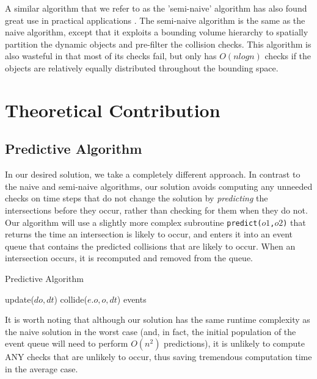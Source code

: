 \documentclass[CEJCS,PDF]{cej} %
\begin{document}
A similar algorithm that we refer to as the 'semi-naive' algorithm has also found great use in practical applications \cite{Bittner02hierarchicaltechniques}.  The semi-naive algorithm is the same as the naive algorithm, except that it exploits a bounding volume hierarchy to spatially partition the dynamic objects and pre-filter the collision checks.  This algorithm is also wasteful in that most of its checks fail, but only has $O(n log n)$ checks if the objects are relatively equally distributed throughout the bounding space.

\section{Theoretical Contribution}
\label{sec:theocont}
\subsection{Predictive Algorithm}

In our desired solution, we take a completely different approach.  In contrast to the naive and semi-naive algorithms, our solution avoids computing any unneeded checks on time steps that do not change the solution by \textit{predicting} the intersections before they occur, rather than checking for them when they do not.  Our algorithm will use a slightly more complex subroutine \texttt{predict($o1$,$o2$)} that returns the time an intersection is likely to occur, and enters it into an event queue that contains the predicted collisions that are likely to occur.  When an intersection occurs, it is recomputed and removed from the queue.

\begin{algorithm}
\caption{Predictive Algorithm}
\begin{algorithmic}
\STATE {} %
		\STATE update($do,dt$)  
	\ENDFOR
	\STATE {}
				\STATE collide($e.o, o, dt$) 
			\ENDIF
		\ENDFOR
	\ENDFOR
\ENDFOR
\RETURN events
\end{algorithmic}
\end{algorithm}

It is worth noting that although our solution has the same runtime complexity as the naive solution in the worst case (and, in fact, the initial population of the event queue will need to perform $O(n^2)$ predictions), it is unlikely to compute ANY checks that are unlikely to occur, thus saving tremendous computation time in the average case.  
\end{document}
